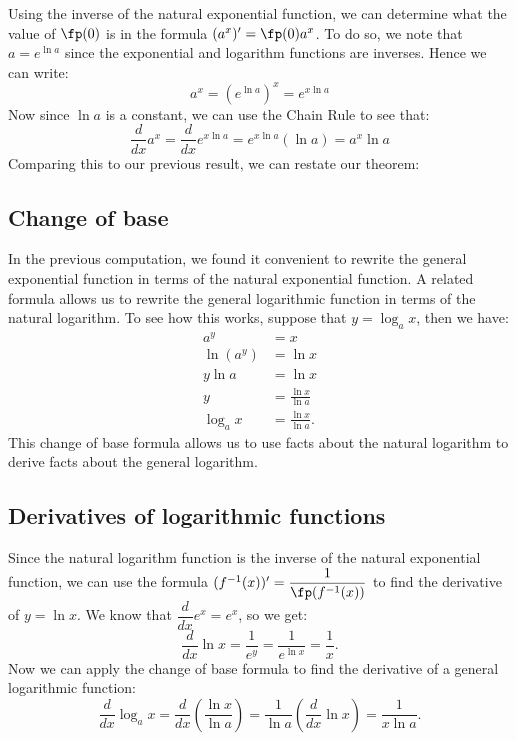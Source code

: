 Using the inverse of the natural exponential function, we can determine what the value of $\fp(0)$ is in the formula $(a^x)'=\fp(0)a^x$. To do so, we note that $a=e^{\ln a}$ since the exponential and logarithm functions are inverses. Hence we can write:
\[a^x=\left(e^{\ln a}\right)^x=e^{x\ln a}\]
Now since $\ln a$ is a constant, we can use the Chain Rule to see that:
\[\frac d{dx} a^x=\frac d{dx} e^{x\ln a} =e^{x\ln a}(\ln a) =a^x\ln a\]
Comparing this to our previous result, we can restate our theorem:


\subsection{Change of base}

In the previous computation, we found it convenient to rewrite the general exponential function in terms of the natural exponential function. A related formula allows us to rewrite the general logarithmic function in terms of the natural logarithm.  To see how this works, suppose that $y=\log_ax$, then we have:
\begin{align*}
a^y&=x \\
\ln(a^y)&=\ln x\\
y\ln a&=\ln x\\
y&=\frac{\ln x}{\ln a}\\
\log_a x&=\frac{\ln x}{\ln a}.
\end{align*}
This change of base formula allows us to use facts about the natural logarithm to derive facts about the general logarithm.

\subsection{Derivatives of logarithmic functions}

Since the natural logarithm function is the inverse of the natural exponential function, we can use the formula $(f^{-1}(x))'=\dfrac1{\fp(f^{-1}(x))}$ to find the derivative of $y=\ln x$. We know that $\dfrac d{dx}e^x=e^x$, so we get:
\[\frac d{dx}\ln x=\frac1{e^y}=\frac1{e^{\ln x}}=\frac1x.\]
Now we
can apply the change of base formula to find the derivative of a general logarithmic function:
\[\frac{d}{dx}\log_ax=\frac{d}{dx}\left(\frac{\ln x}{\ln a}\right) =\frac 1{\ln a}\left(\frac{d}{dx}\ln x\right)=\frac 1{x\ln a}.\]

